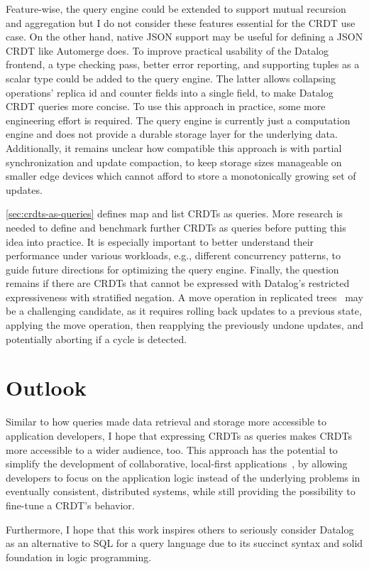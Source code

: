 Feature-wise, the query engine could be extended to support mutual recursion
and aggregation but I do not consider these features essential for the
\ac{CRDT} use case. On the other hand, native JSON support may be useful for
defining a JSON \ac{CRDT} like Automerge does.
To improve practical usability of the Datalog frontend,
a type checking pass, better error reporting, and supporting tuples as a scalar
type could be added to the query engine.
The latter allows collapsing operations' replica id and counter fields
into a single field, to make Datalog \ac{CRDT} queries more concise.
To use this approach in practice, some more engineering effort is required.
The query engine is currently just a computation engine and does not provide
a durable storage layer for the underlying data.
Additionally, it remains unclear how compatible this approach is with
partial synchronization and update compaction, to keep storage sizes manageable
on smaller edge devices which cannot afford to store a monotonically growing
set of updates.

\ref{sec:crdts-as-queries} defines map and list \acp{CRDT} as queries.
More research is needed to define and benchmark further \acp{CRDT} as queries
before putting this idea into practice.
It is especially important to better understand their performance under various
workloads, e.g., different concurrency patterns, to guide future directions for
optimizing the query engine.
Finally, the question remains if there are \acp{CRDT} that cannot be expressed
with Datalog's restricted expressiveness with stratified negation.
A move operation in replicated trees~\cite{moveop1,moveop2} may be a challenging
candidate, as it requires rolling back updates to a previous state,
applying the move operation, then reapplying the previously undone updates,
and potentially aborting if a cycle is detected.

\section{Outlook}\label{sec:outlook}

Similar to how queries made data retrieval and storage more accessible to
application developers, I hope that expressing \acp{CRDT} as queries
makes \acp{CRDT} more accessible to a wider audience, too.
This approach has the potential to simplify the development of
collaborative, local-first applications~\cite{kleppmann2019local},
by allowing developers to focus on the application logic instead of the
underlying problems in eventually consistent, distributed systems, while
still providing the possibility to fine-tune a \ac{CRDT}'s behavior.

Furthermore, I hope that this work inspires others to seriously consider Datalog
as an alternative to SQL for a query language due to its succinct syntax
and solid foundation in logic programming.
